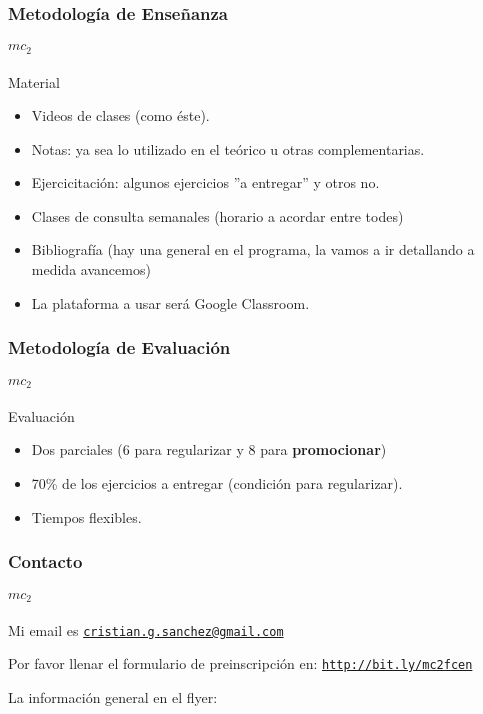 \documentclass{beamer}
\begin{document}
\begin{frame}
    \frametitle{Metodología de Enseñanza}
    \framesubtitle{$mc_2$}

\begin{block}{Material}
    \begin{itemize}
        \item Videos de clases (como éste).
        \item Notas: ya sea lo utilizado en el teórico u otras complementarias.
        \item Ejercicitación: algunos ejercicios ''a entregar'' y otros no.
        \item Clases de consulta semanales (horario a acordar entre todes)
        \item Bibliografía (hay una general en el programa, la vamos a ir detallando a medida avancemos)
        \item La plataforma a usar será Google Classroom.
    \end{itemize}
\end{block}
    
\end{frame}

\begin{frame}
    \frametitle{Metodología de Evaluación}
    \framesubtitle{$mc_2$}

\begin{block}{Evaluación}
    \begin{itemize}
        \item Dos parciales (6 para regularizar y 8 para {\bf promocionar})
        \item 70\% de los ejercicios a entregar (condición para regularizar).
        \item Tiempos {\bf \color{red}} flexibles.
    \end{itemize}

\end{block}
    
\end{frame}

\begin{frame}
    \frametitle{Contacto}
    \framesubtitle{$mc_2$}

Mi email es \href{mailto:cristian.g.sanchez@gmail.com}{\tt cristian.g.sanchez@gmail.com}
\vspace{1cm}

Por favor llenar el formulario de preinscripción en: \href{http://bit.ly/mc2fcen}{\tt http://bit.ly/mc2fcen}
\vspace{1cm}

La información general en el flyer:

    
\end{frame}
\end{document}
